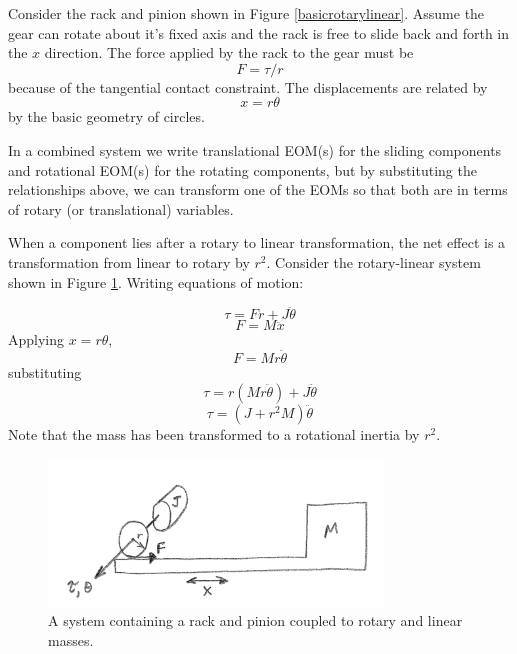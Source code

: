 Consider the rack and pinion shown in Figure \ref{basicrotarylinear}.  Assume the gear can rotate about it's fixed axis and the rack is free to slide back and forth in the $x$ direction.  The force applied by the rack to the gear must be
\[
F = \tau/r
\]
because of the tangential contact constraint.   The displacements are related by
\[
x = r\theta
\]
by the basic geometry of circles.

In a combined system we write translational EOM(s) for the sliding components and rotational EOM(s) for the rotating components, but by substituting the relationships above, we can transform one of the EOMs so that both are in terms of rotary (or translational) variables.

When a component lies after a rotary to linear transformation, the net effect is a transformation from linear to rotary by $r^2$.   Consider the rotary-linear system shown in Figure \ref{rackpinionmasses}. Writing equations of motion:

\[
\tau = Fr + J\ddot{\theta}
\]
\[
F = M\ddot{x}
\]
Applying $x = r\theta$,
\[
F = Mr\ddot{\theta}
\]
substituting
\[
\tau = r(Mr\ddot{\theta}) + J\ddot{\theta}
\]
\[
\tau = (J+r^2M)\ddot{\theta}
\]
Note that the mass has been transformed to a rotational inertia by $r^2$.

\begin{figure}\centering
\includegraphics[width=3.5in]{figs03/00822a.png}
\caption{A system containing a rack and pinion coupled to  rotary and linear masses.}\label{rackpinionmasses}
\end{figure}





